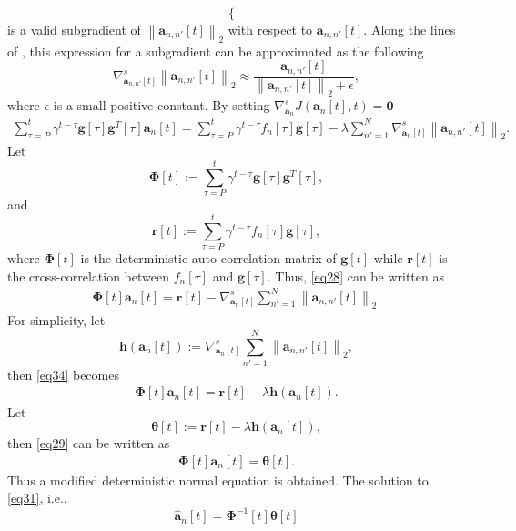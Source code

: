 \documentclass[11pt,final,onecolumn]{IEEEtran}
\begin{document}
\begin{itemize}
\begin{equation}
\begin{cases}
\end{cases}
\end{equation}
is a valid subgradient of $\left \lVert\bm a_{n,n'}[t]\right\rVert_2$ with respect to $\bm a_{n,n'}[t]$. Along the lines of \cite{eksioglu2014group}, this expression for a subgradient can be approximated as the following
\begin{equation}
\nabla_{\bm a_{n,n'}[t]} ^s\left \lVert \bm a_{n,n'}[t]\right\rVert_2\approx \frac{\bm a_{n,n'}[t]}{\left \lVert \bm a_{n,n'}[t] \right \rVert_2+ \epsilon},
\end{equation} 
where $\epsilon$ is a small positive constant.
By setting $\nabla_{\bm a_n}^{s}J(\bm a_n[t],t)=\bm 0$
\begin{align} \label{eq28}
\sum_{\tau=P}^{t}\gamma ^{t-\tau }\bm g[\tau]\bm g^T[\tau]\bm a_n[t]=\sum_{\tau=P}^{t} \gamma ^{t-\tau } f_n[\tau]\bm g[\tau]-\lambda  \sum_{n'=1}^{N} \nabla_{\bm a_n[t]} ^s\left \lVert \bm a_{n,n'}[t]\right\rVert_2.
\end{align}
Let
\begin{equation}\label{key}
\bm \Phi [t]:=\sum_{\tau=P}^{t} \gamma ^{t-\tau } \bm g[\tau]\bm g^T[\tau],
\end{equation}
and 
\begin{equation}\label{key}
\bm r[t]:=\sum_{\tau=P}^{t} \gamma ^{t-\tau } f_n[\tau]\bm g[\tau],
\end{equation}
where $\bm\Phi [t]$ is the deterministic auto-correlation matrix of $\bm g[t]$ while $\bm r[t]$ is the cross-correlation between $f_n[\tau]$ and $\bm g[\tau]$. Thus, \eqref{eq28} can be written as
\begin{align} \label{eq34}
\bm\Phi [t] \bm a_n[t]=\bm r[t]-\nabla_{\bm a_n[t]} ^s \sum_{n'=1}^{N}\left \lVert \bm a_{n,n'}[t]\right\rVert_2.
\end{align}
For simplicity, let 
\begin{equation}
\bm h(\bm a_n[t]):=\nabla_{\bm a_n[t]} ^s \sum_{n'=1}^{N}\left \lVert \bm a_{n,n'}[t]\right\rVert_2,
\end{equation} 
then \eqref{eq34} becomes
\begin{align} \label{eq29}
\bm\Phi [t] \bm a_n[t]=\bm r[t]-\lambda  \bm h(\bm a_n[t]).
\end{align}
Let 
\begin{equation} \label{eq300}
\bm \theta [t]:=\bm r[t]-\lambda  \bm h(\bm a_n[t]),
\end{equation} then \eqref{eq29} can be written as
\begin{align} \label{eq31}
\bm\Phi [t] \bm a_n[t]=\bm \theta [t].
\end{align}
Thus a modified deterministic normal equation is obtained. The solution to \eqref{eq31}, i.e., 
\begin{equation}\label{eqsol2}
\hat{\bm a}_n[t]=\bm\Phi ^{-1}[t] \bm \theta [t]
\end{equation}


\end{itemize}
\end{document}
